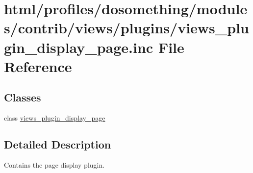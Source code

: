 \hypertarget{views__plugin__display__page_8inc}{
\section{html/profiles/dosomething/modules/contrib/views/plugins/views\_\-plugin\_\-display\_\-page.inc File Reference}
\label{views__plugin__display__page_8inc}
}
\subsection*{Classes}
\begin{DoxyCompactItemize}
\item 
class \hyperlink{classviews__plugin__display__page}{views\_\-plugin\_\-display\_\-page}
\end{DoxyCompactItemize}


\subsection{Detailed Description}
Contains the page display plugin. 